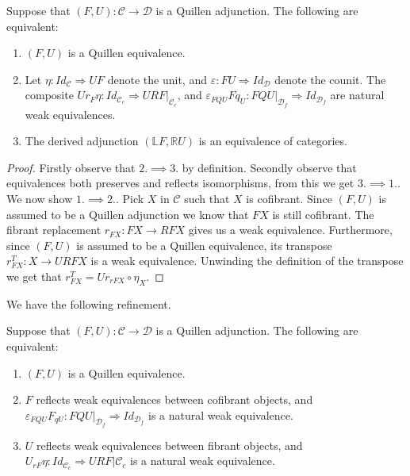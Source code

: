 \documentclass[../thesis.tex]{subfiles}
\begin{document}
            \begin{proposition}\label{prop: Quill-Eq}
                Suppose that $(F,U):\mathcal{C}\rightarrow\mathcal{D}$ is a Quillen adjunction. The following are equivalent:
                \begin{enumerate}
                    \item $(F,U)$ is a Quillen equivalence.
                    \item Let $\eta :Id_\mathcal{C}\Rightarrow UF$ denote the unit, and $\varepsilon :FU\Rightarrow Id_\mathcal{D}$ denote the counit. The composite $Ur_{F}\eta : Id_{\mathcal{C}_c} \Rightarrow URF|_{\mathcal{C}_c}$, and $\varepsilon_{FQU}Fq_{U}:FQU|_{\mathcal{D}_f} \Rightarrow Id_{\mathcal{D}_f}$ are natural weak equivalences.
                    \item The derived adjunction $(\mathbb{L}F, \mathbb{R}U)$ is an equivalence of categories.
                \end{enumerate}
            \end{proposition}

            \begin{proof}
                Firstly observe that $2.\implies3.$ by definition. Secondly observe that equivalences both preserves and reflects isomorphisms, from this we get $3. \implies 1.$. We now show $1.\implies 2.$. Pick $X$ in $\mathcal{C}$ such that $X$ is cofibrant. Since $(F,U)$ is assumed to be a Quillen adjunction we know that $FX$ is still cofibrant. The fibrant replacement $r_{FX}:FX\rightarrow RFX$ gives us a weak equivalence. Furthermore, since $(F,U)$ is assumed to be a Quillen equivalence, its transpose $r_{FX}^T: X \rightarrow URFX$ is a weak equivalence. Unwinding the definition of the transpose we get that $r_{FX}^T = Ur_{rFX}\circ \eta_X$.

            \end{proof}

            We have the following refinement.

            \begin{corollary}\label{cor: Quill-Eq}
                Suppose that $(F,U):\mathcal{C}\rightarrow\mathcal{D}$ is a Quillen adjunction. The following are equivalent:
                \begin{enumerate}
                    \item $(F,U)$ is a Quillen equivalence.
                    \item $F$ reflects weak equivalences between cofibrant objects, and $\varepsilon_{FQU}F_{qU} : FQU|_{\mathcal{D}_f} \Rightarrow Id_{\mathcal{D}_f}$ is a natural weak equivalence.
                    \item $U$ reflects weak equivalences between fibrant objects, and $U_{rF}\eta : Id_{\mathcal{C}_c} \Rightarrow URF|{\mathcal{C}_c}$ is a natural weak equivalence.
                \end{enumerate}
            \end{corollary}
\end{document}
